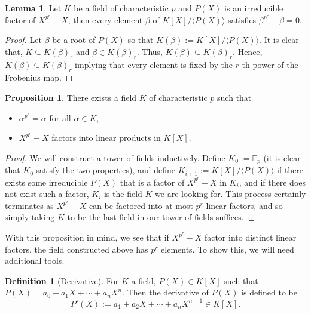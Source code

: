 \documentclass[]{article}
\theoremstyle{definition}
\theoremstyle{definition}
\newtheorem{definition}{Definition}[section]
\newtheorem{lemma}{Lemma}[section]
\newtheorem{proposition}{Proposition}[section]
\begin{document}
\begin{lemma}
  Let \(K\) be a field of characteristic \(p\) and \(P(X)\) is an irreducible 
  factor of \(X^{p^r} - X\), then every element \(\beta\) of 
  \(K[X] / \langle P(X) \rangle\) satisfies \(\beta^{p^r} - \beta = 0\).
\end{lemma}
\begin{proof}
  Let \(\beta\) be a root of \(P(X)\) so that 
  \(K(\beta) := K[X] / \langle P(X) \rangle\). It is clear that, 
  \(K \subseteq K(\beta)_r\) and \(\beta \in K(\beta)_r\). Thus, 
  \(K(\beta) \subseteq K(\beta)_r\). Hence, \(K(\beta) \subseteq K(\beta)_r\)
  implying that every element is fixed by the \(r\)-th power of the 
  Frobenius map.
\end{proof}

\begin{proposition}
  There exists a field \(K\) of characteristic \(p\) such that 
  \begin{itemize}
    \item \(\alpha^{p^r} = \alpha\) for all \(\alpha \in K\),
    \item \(X^{p^r} - X\) factors into linear products in \(K[X]\).
  \end{itemize}
\end{proposition}
\begin{proof}
  We will construct a tower of fields inductively. Define 
  \(K_0 := \mathbb{F}_p\) (it is clear that \(K_0\) satisfy the two properties),
  and define \(K_{i + 1} := K[X] / \langle P(X) \rangle\) if there exists 
  some irreducible \(P(X)\) that is a factor of \(X^{p^r} - X\) in \(K_i\), 
  and if there does not exist such a factor, \(K_i\) is the field \(K\) we are 
  looking for. This process certainly terminates as \(X^{p^r} - X\) can be 
  factored into at most \(p^r\) linear factors, and so simply taking 
  \(K\) to be the last field in our tower of fields suffices.
\end{proof}

With this proposition in mind, we see that if \(X^{p^r} - X\) factor into 
distinct linear factors, the field constructed above has \(p^r\) elements. 
To show this, we will need additional tools.

\begin{definition}[Derivative]
  For \(K\) a field, \(P(X) \in K[X]\) such that 
  \(P(X) = a_0 + a_1 X + \cdots + a_n X^n\). Then the derivative of 
  \(P(X)\) is defined to be 
  \[P'(X) := a_1 + a_2 X + \cdots + a_n X^{n - 1} \in K[X].\]
\end{definition}
\end{document}
